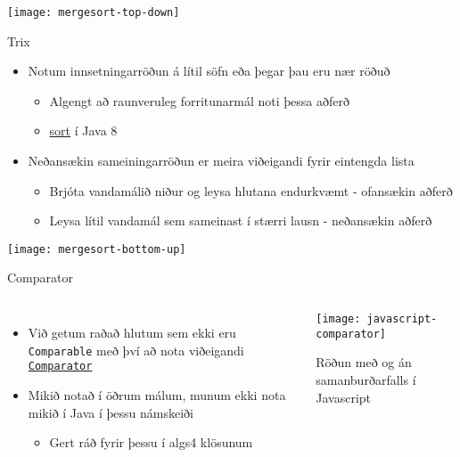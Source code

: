 \documentclass{beamer}
\begin{document}
\begin{frame}
    \vspace{1.5cm}
    \begin{centering}
        \texttt{[image: mergesort-top-down]}
    \end{centering}
\end{frame}

\begin{frame}{Trix}
	\begin{itemize}
		\item Notum innsetningarröðun á lítil söfn eða þegar þau eru nær röðuð
		      \begin{itemize}
			      \item Algengt að raunveruleg forritunarmál noti þessa aðferð
			      \item \href{https://docs.oracle.com/javase/8/docs/api/java/util/Arrays.html}{sort} í Java 8
		      \end{itemize}
		\item Neðansækin  sameiningarröðun er meira viðeigandi fyrir eintengda lista
		      \begin{itemize}
			      \item Brjóta vandamálið niður og leysa hlutana endurkvæmt - ofansækin aðferð
			      \item Leysa lítil vandamál sem sameinast í stærri lausn - neðansækin aðferð
		      \end{itemize}
	\end{itemize}
\end{frame}

\begin{frame}
    \vspace{1.5cm}
    \begin{centering}
        \texttt{[image: mergesort-bottom-up]}
    \end{centering}
\end{frame}

\begin{frame}{Comparator}
	\begin{columns}
		\begin{itemize}
			\item Við getum raðað hlutum sem ekki eru \texttt{Comparable} með því að nota viðeigandi \href{https://docs.oracle.com/javase/8/docs/api/java/util/Comparator.html}{\texttt{Comparator}}
			\item Mikið notað í öðrum málum, munum ekki nota mikið í Java í þessu námskeiði
			      \begin{itemize}
				      \item Gert ráð fyrir þessu í algs4 klösunum
			      \end{itemize}
		\end{itemize}
		\begin{center}
			\texttt{[image: javascript-comparator]}

			Röðun með og án samanburðarfalls í Javascript
		\end{center}
	\end{columns}
\end{frame}
\end{document}
